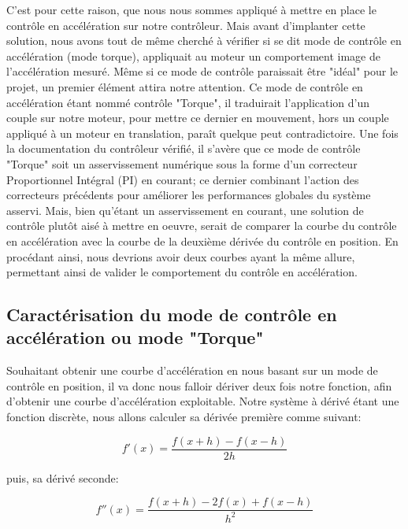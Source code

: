 \documentclass[french,a4paper,12pt]{report}
\begin{document}
	C'est pour cette raison, que nous nous sommes appliqué à mettre en place le contrôle en accélération sur notre contrôleur. Mais avant d'implanter cette solution, nous avons tout de même cherché à vérifier si se dit mode de contrôle en accélération (mode torque), appliquait au moteur un comportement image de l'accélération mesuré. Même si ce mode de contrôle paraissait être "idéal" pour le projet, un premier élément attira notre attention. Ce mode de contrôle en accélération étant nommé contrôle "Torque", il traduirait l'application d'un couple sur notre moteur, pour mettre ce dernier en mouvement, hors un couple appliqué à un moteur en translation, paraît quelque peut contradictoire.
	Une fois la documentation du contrôleur vérifié, il s'avère que ce mode de contrôle "Torque" soit un asservissement numérique sous la forme d'un correcteur Proportionnel Intégral (PI) en courant; ce dernier combinant l'action des correcteurs précédents pour améliorer les performances globales du système asservi. Mais, bien qu'étant un asservissement en courant, une solution de contrôle plutôt aisé à mettre en oeuvre, serait de comparer la courbe du contrôle en accélération avec la courbe de la deuxième dérivée du contrôle en position. En procédant ainsi, nous devrions avoir deux courbes ayant la même allure, permettant ainsi de valider le comportement du contrôle en accélération.
	
		\subsection{Caractérisation du mode de contrôle en accélération ou mode "Torque"}

	Souhaitant obtenir une courbe d'accélération en nous basant sur un mode de contrôle en position, il va donc nous falloir dériver deux fois notre fonction, afin d'obtenir une courbe d'accélération exploitable.
	Notre système à dérivé étant une fonction discrète, nous allons calculer sa dérivée première comme suivant: 
	
	\[	
		f'(x) = \frac{f(x+h) - f(x-h)}{2h}
	\]
	
	puis, sa dérivé seconde:
	
	\[	
		f''(x) = \frac{f(x+h) - 2f(x) + f(x-h)}{h^2}
	\]
	
\end{document}
